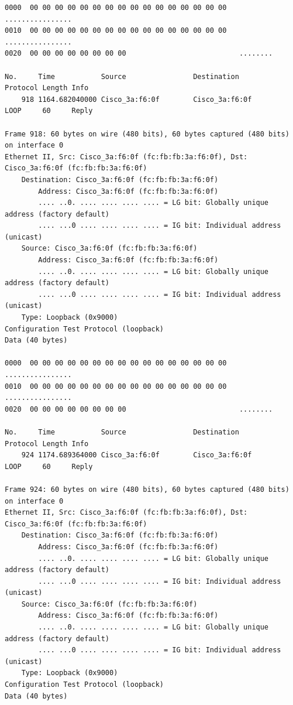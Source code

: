 \documentclass[a4paper,11pt]{article}
\begin{document}
\begin{lstlisting}
0000  00 00 00 00 00 00 00 00 00 00 00 00 00 00 00 00   ................
0010  00 00 00 00 00 00 00 00 00 00 00 00 00 00 00 00   ................
0020  00 00 00 00 00 00 00 00                           ........

No.     Time           Source                Destination           Protocol Length Info
    918 1164.682040000 Cisco_3a:f6:0f        Cisco_3a:f6:0f        LOOP     60     Reply

Frame 918: 60 bytes on wire (480 bits), 60 bytes captured (480 bits) on interface 0
Ethernet II, Src: Cisco_3a:f6:0f (fc:fb:fb:3a:f6:0f), Dst: Cisco_3a:f6:0f (fc:fb:fb:3a:f6:0f)
    Destination: Cisco_3a:f6:0f (fc:fb:fb:3a:f6:0f)
        Address: Cisco_3a:f6:0f (fc:fb:fb:3a:f6:0f)
        .... ..0. .... .... .... .... = LG bit: Globally unique address (factory default)
        .... ...0 .... .... .... .... = IG bit: Individual address (unicast)
    Source: Cisco_3a:f6:0f (fc:fb:fb:3a:f6:0f)
        Address: Cisco_3a:f6:0f (fc:fb:fb:3a:f6:0f)
        .... ..0. .... .... .... .... = LG bit: Globally unique address (factory default)
        .... ...0 .... .... .... .... = IG bit: Individual address (unicast)
    Type: Loopback (0x9000)
Configuration Test Protocol (loopback)
Data (40 bytes)

0000  00 00 00 00 00 00 00 00 00 00 00 00 00 00 00 00   ................
0010  00 00 00 00 00 00 00 00 00 00 00 00 00 00 00 00   ................
0020  00 00 00 00 00 00 00 00                           ........

No.     Time           Source                Destination           Protocol Length Info
    924 1174.689364000 Cisco_3a:f6:0f        Cisco_3a:f6:0f        LOOP     60     Reply

Frame 924: 60 bytes on wire (480 bits), 60 bytes captured (480 bits) on interface 0
Ethernet II, Src: Cisco_3a:f6:0f (fc:fb:fb:3a:f6:0f), Dst: Cisco_3a:f6:0f (fc:fb:fb:3a:f6:0f)
    Destination: Cisco_3a:f6:0f (fc:fb:fb:3a:f6:0f)
        Address: Cisco_3a:f6:0f (fc:fb:fb:3a:f6:0f)
        .... ..0. .... .... .... .... = LG bit: Globally unique address (factory default)
        .... ...0 .... .... .... .... = IG bit: Individual address (unicast)
    Source: Cisco_3a:f6:0f (fc:fb:fb:3a:f6:0f)
        Address: Cisco_3a:f6:0f (fc:fb:fb:3a:f6:0f)
        .... ..0. .... .... .... .... = LG bit: Globally unique address (factory default)
        .... ...0 .... .... .... .... = IG bit: Individual address (unicast)
    Type: Loopback (0x9000)
Configuration Test Protocol (loopback)
Data (40 bytes)


\end{lstlisting}
\end{document}
